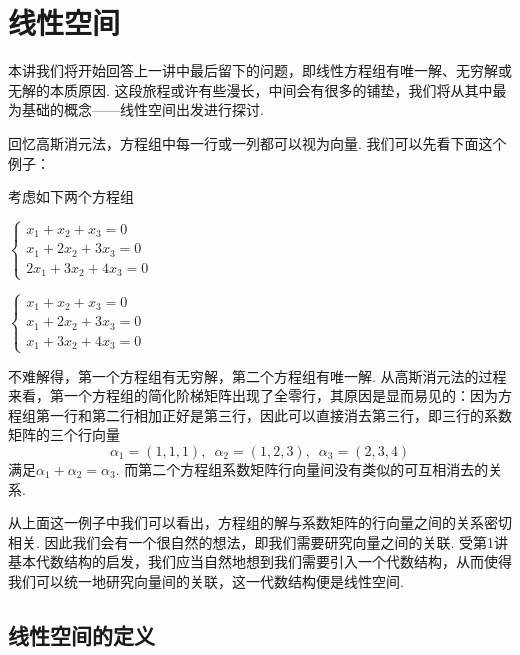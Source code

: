 \chapter{线性空间}

本讲我们将开始回答上一讲中最后留下的问题，即线性方程组有唯一解、无穷解或无解的本质原因. 这段旅程或许有些漫长，中间会有很多的铺垫，我们将从其中最为基础的概念——线性空间出发进行探讨.

回忆高斯消元法，方程组中每一行或一列都可以视为向量. 我们可以先看下面这个例子：
\begin{example}\label{ex:2:线性空间引入}
    考虑如下两个方程组
    \begin{multicols}{2}
        \item $\begin{cases}
                x_1+x_2+x_3=0   \\
                x_1+2x_2+3x_3=0 \\
                2x_1+3x_2+4x_3=0
            \end{cases}$

        \item $\begin{cases}
                x_1+x_2+x_3=0   \\
                x_1+2x_2+3x_3=0 \\
                x_1+3x_2+4x_3=0
            \end{cases}$
    \end{multicols}
    不难解得，第一个方程组有无穷解，第二个方程组有唯一解. 从高斯消元法的过程来看，第一个方程组的简化阶梯矩阵出现了全零行，其原因是显而易见的：因为方程组第一行和第二行相加正好是第三行，因此可以直接消去第三行，即三行的系数矩阵的三个行向量
    \[\alpha_1=(1,1,1),\enspace\alpha_2=(1,2,3),\enspace\alpha_3=(2,3,4)\]
    满足$\alpha_1+\alpha_2=\alpha_3$. 而第二个方程组系数矩阵行向量间没有类似的可互相消去的关系.
\end{example}

从上面这一例子中我们可以看出，方程组的解与系数矩阵的行向量之间的关系密切相关. 因此我们会有一个很自然的想法，即我们需要研究向量之间的关联. 受第1讲基本代数结构的启发，我们应当自然地想到我们需要引入一个代数结构，从而使得我们可以统一地研究向量间的关联，这一代数结构便是线性空间.

\section{线性空间的定义}

